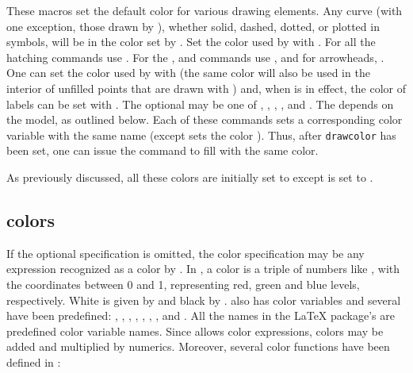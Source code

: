 \documentclass[letterpaper]{article}
\begin{document}
These macros set the default color for various drawing elements. Any
curve (with one exception, those drawn by ), whether solid,
dashed, dotted, or plotted in symbols, will be in the color set by
. Set the color used by  with .
For all the hatching commands use . For the ,
 and  commands use , and for
arrowheads, . One can set the color used by 
with  (the same color will also be used in the
interior of unfilled points that are drawn with ) and, when
 is in effect, the color of labels can be set with
. The optional  may be one of ,
, , , and . The 
depends on the model, as outlined below. Each of these commands sets a
corresponding \MP{} color variable with the same name (except
 sets the color ). Thus, after
\texttt{drawcolor} has been set, one can issue the command
 to fill with the same color.

As previously discussed, all these colors are initially set to
 except  is set to .

\subsection{\CMP{} colors}\label{mpcolors}

If the optional  specification is omitted, the color
specification may be any expression recognized as a color by \MP{}. In
\MP{}, a color is a triple of numbers like , with the
coordinates between 0 and 1, representing red, green and blue levels,
respectively. White is given by  and black by
. \CMP{} also has color variables and several have been
predefined: , , , ,
, , , and . All the names
in the \LaTeX{}  package's  are
predefined color variable names. Since \MP{} allows color expressions,
colors may be added and multiplied by numerics. Moreover, several \MP{}
color functions have been defined in :

\begin{cd}
%
\end{cd}
\end{document}
